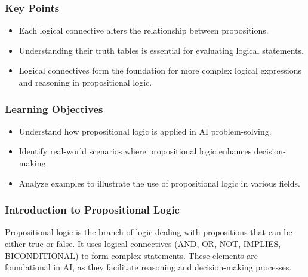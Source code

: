 \documentclass[aspectratio=169]{beamer}
\begin{document}
\begin{frame}[fragile]
    \frametitle{Key Points}
    \begin{itemize}
        \item Each logical connective alters the relationship between propositions.
        \item Understanding their truth tables is essential for evaluating logical statements.
        \item Logical connectives form the foundation for more complex logical expressions and reasoning in propositional logic.
    \end{itemize}
\end{frame}

\begin{frame}[fragile]
    \frametitle{Learning Objectives}
    \begin{itemize}
        \item Understand how propositional logic is applied in AI problem-solving.
        \item Identify real-world scenarios where propositional logic enhances decision-making.
        \item Analyze examples to illustrate the use of propositional logic in various fields.
    \end{itemize}
\end{frame}

\begin{frame}[fragile]
    \frametitle{Introduction to Propositional Logic}
    Propositional logic is the branch of logic dealing with propositions that can be either true or false. It uses logical connectives (AND, OR, NOT, IMPLIES, BICONDITIONAL) to form complex statements.  
    These elements are foundational in AI, as they facilitate reasoning and decision-making processes.
\end{frame}
\end{document}
